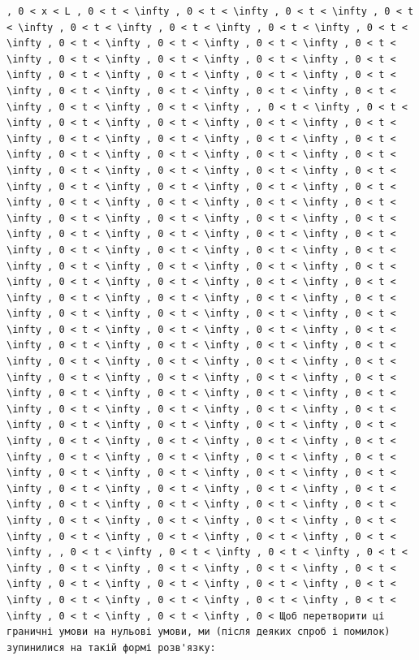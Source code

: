 \documentclass[
  ukrainian,
]{article}
\begin{document}
\begin{verbatim}
, 0 < x < L , 0 < t < \infty , 0 < t < \infty , 0 < t < \infty , 0 < t < \infty , 0 < t < \infty , 0 < t < \infty , 0 < t < \infty , 0 < t < \infty , 0 < t < \infty , 0 < t < \infty , 0 < t < \infty , 0 < t < \infty , 0 < t < \infty , 0 < t < \infty , 0 < t < \infty , 0 < t < \infty , 0 < t < \infty , 0 < t < \infty , 0 < t < \infty , 0 < t < \infty , 0 < t < \infty , 0 < t < \infty , 0 < t < \infty , 0 < t < \infty , 0 < t < \infty , 0 < t < \infty , , 0 < t < \infty , 0 < t < \infty , 0 < t < \infty , 0 < t < \infty , 0 < t < \infty , 0 < t < \infty , 0 < t < \infty , 0 < t < \infty , 0 < t < \infty , 0 < t < \infty , 0 < t < \infty , 0 < t < \infty , 0 < t < \infty , 0 < t < \infty , 0 < t < \infty , 0 < t < \infty , 0 < t < \infty , 0 < t < \infty , 0 < t < \infty , 0 < t < \infty , 0 < t < \infty , 0 < t < \infty , 0 < t < \infty , 0 < t < \infty , 0 < t < \infty , 0 < t < \infty , 0 < t < \infty , 0 < t < \infty , 0 < t < \infty , 0 < t < \infty , 0 < t < \infty , 0 < t < \infty , 0 < t < \infty , 0 < t < \infty , 0 < t < \infty , 0 < t < \infty , 0 < t < \infty , 0 < t < \infty , 0 < t < \infty , 0 < t < \infty , 0 < t < \infty , 0 < t < \infty , 0 < t < \infty , 0 < t < \infty , 0 < t < \infty , 0 < t < \infty , 0 < t < \infty , 0 < t < \infty , 0 < t < \infty , 0 < t < \infty , 0 < t < \infty , 0 < t < \infty , 0 < t < \infty , 0 < t < \infty , 0 < t < \infty , 0 < t < \infty , 0 < t < \infty , 0 < t < \infty , 0 < t < \infty , 0 < t < \infty , 0 < t < \infty , 0 < t < \infty , 0 < t < \infty , 0 < t < \infty , 0 < t < \infty , 0 < t < \infty , 0 < t < \infty , 0 < t < \infty , 0 < t < \infty , 0 < t < \infty , 0 < t < \infty , 0 < t < \infty , 0 < t < \infty , 0 < t < \infty , 0 < t < \infty , 0 < t < \infty , 0 < t < \infty , 0 < t < \infty , 0 < t < \infty , 0 < t < \infty , 0 < t < \infty , 0 < t < \infty , 0 < t < \infty , 0 < t < \infty , 0 < t < \infty , 0 < t < \infty , 0 < t < \infty , 0 < t < \infty , 0 < t < \infty , 0 < t < \infty , 0 < t < \infty , 0 < t < \infty , 0 < t < \infty , 0 < t < \infty , 0 < t < \infty , 0 < t < \infty , 0 < t < \infty , 0 < t < \infty , 0 < t < \infty , 0 < t < \infty , 0 < t < \infty , 0 < t < \infty , 0 < t < \infty , 0 < t < \infty , 0 < t < \infty , 0 < t < \infty , 0 < t < \infty , 0 < t < \infty , 0 < t < \infty , 0 < t < \infty , , 0 < t < \infty , 0 < t < \infty , 0 < t < \infty , 0 < t < \infty , 0 < t < \infty , 0 < t < \infty , 0 < t < \infty , 0 < t < \infty , 0 < t < \infty , 0 < t < \infty , 0 < t < \infty , 0 < t < \infty , 0 < t < \infty , 0 < t < \infty , 0 < t < \infty , 0 < t < \infty , 0 < t < \infty , 0 < t < \infty , 0 < Щоб перетворити ці граничні умови на нульові умови, ми (після деяких спроб і помилок) зупинилися на такій формі розв'язку:
\end{verbatim}
\end{document}
